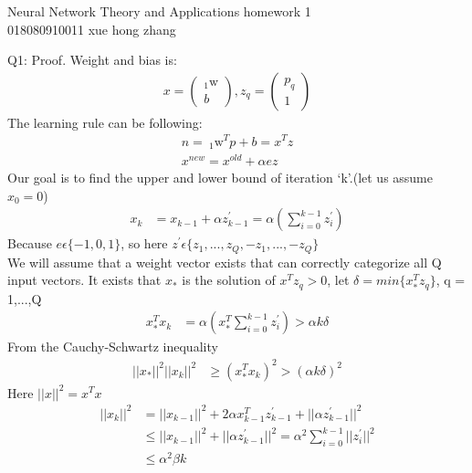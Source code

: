 \documentclass{article}
\begin{document}
\begin{center}
Neural Network Theory and Applications homework 1 \\
018080910011 xue hong zhang
\end{center}
Q1: Proof. Weight and bias is: 
\begin{equation}
\begin{aligned}
x=
\begin{pmatrix}
_{1}\textrm{w}\\ 
b
\end{pmatrix},z_q=\begin{pmatrix}
p_q\\ 
1
\end{pmatrix}
\end{aligned}
\end{equation}
The learning rule can be following:
\begin{equation}
\begin{aligned}
n= ~_{1}\textrm{w} ^T p + b = x^T z \\
x^{new} = x^{old} + \alpha ez
\end{aligned}
\end{equation}
Our goal is to find the upper and lower bound of iteration ‘k’.(let us assume $x_0 = 0$)
\begin{equation}
\begin{aligned}
x_k & = x_{k-1}+\alpha z_{k-1}^{'} = \alpha ( \sum_{i=0}^{k-1} z_{i}^{'})
\end{aligned}
\end{equation}
Because $e \epsilon \{-1,0,1\}$, so here $z^{'} \epsilon \{z_1,...,z_Q,-z_1,...,-z_Q\}$ \\
We will assume that a weight vector exists that can correctly categorize all Q input vectors. It exists that $ x_* $ is  the  solution  of $x^T z_q > 0 $, let $\delta = min\{x_*^T z_q\}$, q = 1,...,Q
\begin{equation}
\begin{aligned}
x_*^T x_k & = \alpha(x_*^T \sum_{i=0}^{k-1} z_{i}^{'})  > \alpha k \delta 
\end{aligned}
\end{equation}
From the Cauchy-Schwartz inequality
\begin{equation}
\begin{aligned}
||x_*||^2 ||x_k||^2 & \geq (x_*^T x_k)^2  > (\alpha k \delta)^2 
\end{aligned}
\end{equation}
Here $||x||^2 = x^T x$
\begin{equation}
\begin{aligned}
||x_k||^2 & = ||x_{k-1}||^2  + 2 \alpha x^T_{k-1} z^{'}_{k-1} + ||\alpha z^{'}_{k-1}||^2 \\
& \leq ||x_{k-1}||^2  + ||\alpha z^{'}_{k-1}||^2 = \alpha ^2 \sum_{i=0}^{k-1} ||z^{'}_{i}||^2 \\ 
& \leq \alpha ^2 \beta k
\end{aligned}
\end{equation}
\end{document}
